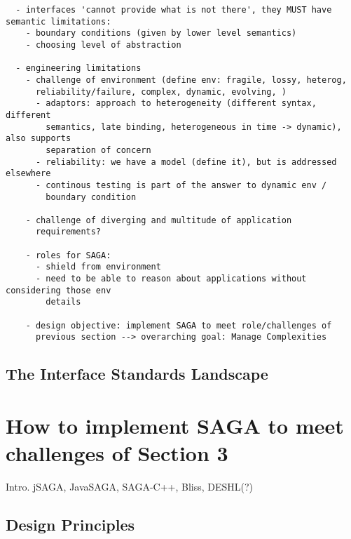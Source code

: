 \documentclass[a4paper,10pt]{article}
\begin{document}
  \begin{verbatim}
  - interfaces 'cannot provide what is not there', they MUST have semantic limitations:
    - boundary conditions (given by lower level semantics)
    - choosing level of abstraction

  - engineering limitations
    - challenge of environment (define env: fragile, lossy, heterog,
      reliability/failure, complex, dynamic, evolving, ) 
      - adaptors: approach to heterogeneity (different syntax, different
        semantics, late binding, heterogeneous in time -> dynamic), also supports 
        separation of concern
      - reliability: we have a model (define it), but is addressed elsewhere
      - continous testing is part of the answer to dynamic env /
        boundary condition

    - challenge of diverging and multitude of application
      requirements?

    - roles for SAGA: 
      - shield from environment
      - need to be able to reason about applications without considering those env
        details

    - design objective: implement SAGA to meet role/challenges of
      previous section --> overarching goal: Manage Complexities

  \end{verbatim}


 \subsection{The Interface Standards Landscape}
 \label{interface_landscape}




\section{How to implement SAGA to meet challenges of Section 3}
\label{saga_impls}

 Intro. jSAGA, JavaSAGA, SAGA-C++, Bliss, DESHL(?)

 \subsection{Design Principles}
\end{document}
